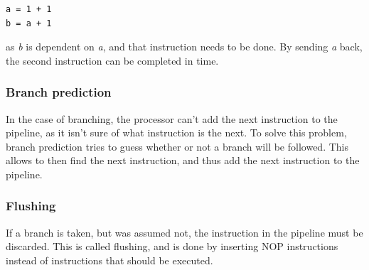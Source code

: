 \begin{verbatim}
a = 1 + 1
b = a + 1
\end{verbatim}

as \textit{b} is dependent on \textit{a}, and that instruction needs to be done.
By sending \textit{a} back, the second instruction can be completed in time.


\subsubsection*{Branch prediction}
In the case of branching, the processor can't add the next instruction to the
pipeline, as it isn't sure of what instruction is the next. To solve this
problem, branch prediction tries to guess whether or not a branch will be
followed. This allows to then find the next instruction, and thus add the next
instruction to the pipeline.


\subsubsection*{Flushing}
If a branch is taken, but was assumed not, the instruction in the pipeline must
be discarded. This is called flushing, and is done by inserting NOP instructions
instead of instructions that should be executed.
